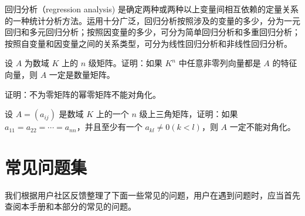 \documentclass[lang=cn,10pt,cite=super]{elegantbook}
\begin{document}
\begin{conclusion}
回归分析（regression analysis) 是确定两种或两种以上变量间相互依赖的定量关系的一种统计分析方法。运用十分广泛，回归分析按照涉及的变量的多少，分为一元回归和多元回归分析；按照因变量的多少，可分为简单回归分析和多重回归分析；按照自变量和因变量之间的关系类型，可分为线性回归分析和非线性回归分析。
\end{conclusion}

\begin{problemset}
\item 设 $A$ 为数域 $K$ 上的 $n$ 级矩阵。证明：如果 $K^n$ 中任意非零列向量都是 $A$ 的特征向量，则 $A$ 一定是数量矩阵。
\item 证明：不为零矩阵的幂零矩阵不能对角化。
\item 设 $A = (a_{ij})$ 是数域 $K$ 上的一个 $n$ 级上三角矩阵，证明：如果 $a_{11} = a_{22} = \cdots = a_{nn}$，并且至少有一个 $a_{kl} \not = 0 (k < l)$，则 $A$ 一定不能对角化。
\end{problemset}

\chapter{常见问题集}

我们根据用户社区反馈整理了下面一些常见的问题，用户在遇到问题时，应当首先查阅本手册和本部分的常见的问题。
\end{document}
